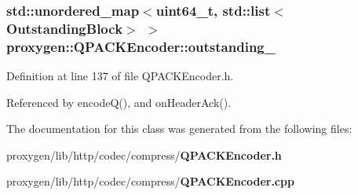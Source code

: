 \subsubsection[{outstanding\+\_\+}]{\setlength{\rightskip}{0pt plus 5cm}std\+::unordered\+\_\+map$<$uint64\+\_\+t, std\+::list$<${\bf Outstanding\+Block}$>$ $>$ proxygen\+::\+Q\+P\+A\+C\+K\+Encoder\+::outstanding\+\_\+\hspace{0.3cm}{\ttfamily [private]}}\label{classproxygen_1_1QPACKEncoder_a2ca20f63886b97ac3aea18243a8457a3}


Definition at line 137 of file Q\+P\+A\+C\+K\+Encoder.\+h.



Referenced by encode\+Q(), and on\+Header\+Ack().



The documentation for this class was generated from the following files\+:\begin{DoxyCompactItemize}
\item 
proxygen/lib/http/codec/compress/{\bf Q\+P\+A\+C\+K\+Encoder.\+h}\item 
proxygen/lib/http/codec/compress/{\bf Q\+P\+A\+C\+K\+Encoder.\+cpp}\end{DoxyCompactItemize}
